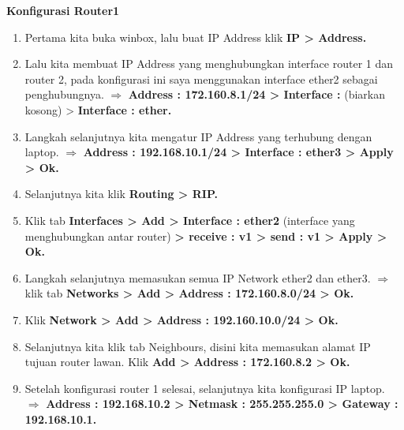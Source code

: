 \begin{center}
	\textbf{Konfigurasi Router1}
\end{center}
\begin{enumerate}
	\item Pertama kita buka winbox, lalu buat IP Address klik \textbf{IP > Address.}
	\item Lalu kita membuat IP Address yang menghubungkan interface router 1 dan router 2, pada konfigurasi ini saya menggunakan interface ether2 sebagai penghubungnya. $\Rightarrow$ \textbf{Address : 172.160.8.1/24 > Interface :} (biarkan kosong) > \textbf{Interface : ether.}
	\item Langkah selanjutnya kita mengatur IP Address yang terhubung dengan laptop. $\Rightarrow$ \textbf{Address : 192.168.10.1/24 > Interface : ether3 > Apply > Ok.}
	\item Selanjutnya kita klik \textbf{Routing > RIP.}
	\item Klik tab \textbf{Interfaces > Add > Interface : ether2} (interface yang menghubungkan antar router) \textbf{> receive : v1 > send : v1 > Apply > Ok.}
	\item Langkah selanjutnya memasukan semua IP Network ether2 dan ether3. $\Rightarrow$ klik tab \textbf{Networks > Add > Address : 172.160.8.0/24 > Ok.}
	\item Klik \textbf{Network > Add > Address : 192.160.10.0/24 > Ok.}
	\item Selanjutnya kita klik tab Neighbours, disini kita memasukan alamat IP tujuan router lawan. Klik \textbf{Add > Address : 172.160.8.2 > Ok.}
	\item Setelah konfigurasi router 1 selesai, selanjutnya kita konfigurasi IP laptop. $\Rightarrow$ \textbf{Address : 192.168.10.2 > Netmask : 255.255.255.0 > Gateway : 192.168.10.1.}
\end{enumerate}

